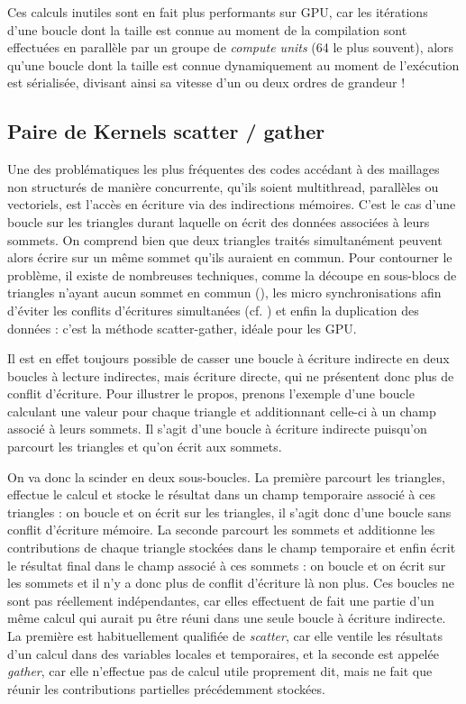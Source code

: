 \documentclass[a4paper,12pt]{article}
\begin{document}
Ces calculs inutiles sont en fait plus performants sur GPU, car les itérations d'une boucle dont la taille est connue au moment de la compilation sont effectuées en parallèle par un groupe de \emph{compute units} (64 le plus souvent), alors qu'une boucle dont la taille est connue dynamiquement au moment de l'exécution est sérialisée, divisant ainsi sa vitesse d'un ou deux ordres de grandeur !


\subsection{Paire de Kernels scatter / gather}
Une des problématiques les plus fréquentes des codes accédant à des maillages non structurés de manière concurrente, qu'ils soient multithread, parallèles ou vectoriels, est l'accès en écriture via des indirections mémoires.
C'est le cas d'une boucle sur les triangles durant laquelle on écrit des données associées à leurs sommets.
On comprend bien que deux triangles traités simultanément peuvent alors écrire sur un même sommet qu'ils auraient en commun.
Pour contourner le problème, il existe de nombreuses techniques, comme la découpe en sous-blocs de triangles n'ayant aucun sommet en commun (\cite{lplib}), les micro synchronisations afin d'éviter les conflits d'écritures simultanées (cf. \cite{atomic}) et enfin la duplication des données : c'est la méthode scatter-gather, idéale pour les GPU.

Il est en effet toujours possible de casser une boucle à écriture indirecte en deux boucles à lecture indirectes, mais écriture directe, qui ne présentent donc plus de conflit d'écriture.
Pour illustrer le propos, prenons l'exemple d'une boucle calculant une valeur pour chaque triangle et additionnant celle-ci à un champ associé à leurs sommets.
Il s'agit d'une boucle à écriture indirecte puisqu'on parcourt les triangles et qu'on écrit aux sommets.

On va donc la scinder en deux sous-boucles.
La première parcourt les triangles, effectue le calcul et stocke le résultat dans un champ temporaire associé à ces triangles : on boucle et on écrit sur les triangles, il s'agit donc d'une boucle sans conflit d'écriture mémoire.
La seconde parcourt les sommets et additionne les contributions de chaque triangle stockées dans le champ temporaire et enfin écrit le résultat final dans le champ associé à ces sommets : on boucle et on écrit sur les sommets et il n'y a donc plus de conflit d'écriture là non plus.
Ces boucles ne sont pas réellement indépendantes, car elles effectuent de fait une partie d'un même calcul qui aurait pu être réuni dans une seule boucle à écriture indirecte.
La première est habituellement qualifiée de \emph{scatter}, car elle ventile les résultats d'un calcul dans des variables locales et temporaires, et la seconde est appelée \emph{gather}, car elle n'effectue pas de calcul utile proprement dit, mais ne fait que réunir les contributions partielles précédemment stockées.
\end{document}
